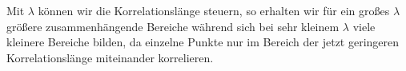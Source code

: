 \begin{figure}[H]
	\centering
\end{figure}
Mit $\lambda$ können wir die Korrelationslänge steuern, so erhalten wir für ein großes $\lambda$ größere zusammenhängende Bereiche während sich bei sehr kleinem $\lambda$ viele kleinere Bereiche bilden, da einzelne Punkte nur im Bereich der jetzt geringeren Korrelationslänge miteinander korrelieren.

